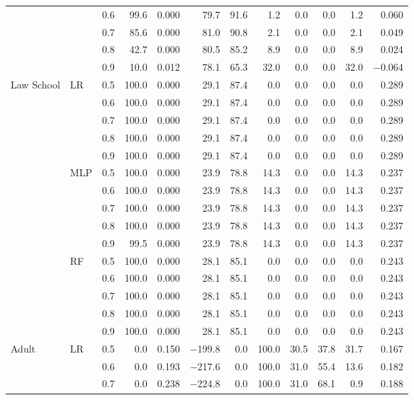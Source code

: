 \begin{table}[t]
\begin{tabular}{lllrrrrrrrrr}
 &  & 0.6 & 99.6 & 0.000 & 79.7 & 91.6 & 1.2 & 0.0 & 0.0 & 1.2 & 0.060 \\
 &  & 0.7 & 85.6 & 0.000 & 81.0 & 90.8 & 2.1 & 0.0 & 0.0 & 2.1 & 0.049 \\
 &  & 0.8 & 42.7 & 0.000 & 80.5 & 85.2 & 8.9 & 0.0 & 0.0 & 8.9 & 0.024 \\
 &  & 0.9 & 10.0 & 0.012 & 78.1 & 65.3 & 32.0 & 0.0 & 0.0 & 32.0 & $-$0.064 \\
\hline
Law School & LR & 0.5 & 100.0 & 0.000 & 29.1 & 87.4 & 0.0 & 0.0 & 0.0 & 0.0 & 0.289 \\
 &  & 0.6 & 100.0 & 0.000 & 29.1 & 87.4 & 0.0 & 0.0 & 0.0 & 0.0 & 0.289 \\
 &  & 0.7 & 100.0 & 0.000 & 29.1 & 87.4 & 0.0 & 0.0 & 0.0 & 0.0 & 0.289 \\
 &  & 0.8 & 100.0 & 0.000 & 29.1 & 87.4 & 0.0 & 0.0 & 0.0 & 0.0 & 0.289 \\
 &  & 0.9 & 100.0 & 0.000 & 29.1 & 87.4 & 0.0 & 0.0 & 0.0 & 0.0 & 0.289 \\
\cline{2-12}
 & MLP & 0.5 & 100.0 & 0.000 & 23.9 & 78.8 & 14.3 & 0.0 & 0.0 & 14.3 & 0.237 \\
 &  & 0.6 & 100.0 & 0.000 & 23.9 & 78.8 & 14.3 & 0.0 & 0.0 & 14.3 & 0.237 \\
 &  & 0.7 & 100.0 & 0.000 & 23.9 & 78.8 & 14.3 & 0.0 & 0.0 & 14.3 & 0.237 \\
 &  & 0.8 & 100.0 & 0.000 & 23.9 & 78.8 & 14.3 & 0.0 & 0.0 & 14.3 & 0.237 \\
 &  & 0.9 & 99.5 & 0.000 & 23.9 & 78.8 & 14.3 & 0.0 & 0.0 & 14.3 & 0.237 \\
\cline{2-12}
 & RF & 0.5 & 100.0 & 0.000 & 28.1 & 85.1 & 0.0 & 0.0 & 0.0 & 0.0 & 0.243 \\
 &  & 0.6 & 100.0 & 0.000 & 28.1 & 85.1 & 0.0 & 0.0 & 0.0 & 0.0 & 0.243 \\
 &  & 0.7 & 100.0 & 0.000 & 28.1 & 85.1 & 0.0 & 0.0 & 0.0 & 0.0 & 0.243 \\
 &  & 0.8 & 100.0 & 0.000 & 28.1 & 85.1 & 0.0 & 0.0 & 0.0 & 0.0 & 0.243 \\
 &  & 0.9 & 100.0 & 0.000 & 28.1 & 85.1 & 0.0 & 0.0 & 0.0 & 0.0 & 0.243 \\
\hline
Adult & LR & 0.5 & 0.0 & 0.150 & $-$199.8 & 0.0 & 100.0 & 30.5 & 37.8 & 31.7 & 0.167 \\
 &  & 0.6 & 0.0 & 0.193 & $-$217.6 & 0.0 & 100.0 & 31.0 & 55.4 & 13.6 & 0.182 \\
 &  & 0.7 & 0.0 & 0.238 & $-$224.8 & 0.0 & 100.0 & 31.0 & 68.1 & 0.9 & 0.188 \\

\end{tabular}
\end{table}
